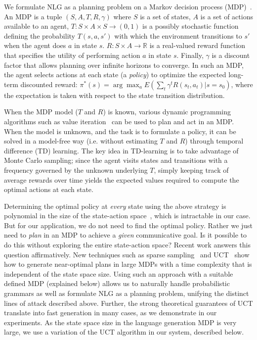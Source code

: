We formulate NLG as a planning problem on a Markov decision process
(MDP)~\cite{puterman_1994_markov}. An MDP is a tuple $(S, A, T, R, \gamma)$ where $S$ is a
set of states, $A$ is a set of actions available to an agent,
$T:S\times A\times S \rightarrow (0,1)$ is a possibly stochastic
function defining the probability $T(s,a,s')$ with which the
environment transitions to $s'$ when the agent does $a$ in state $s$.
$R:S\times A \rightarrow \mathbb{R}$ is a real-valued reward function that
specifies the utility of performing action $a$ in state $s$. Finally,
$\gamma$ is a discount factor that allows planning over infinite
horizons to converge. In such an MDP, the agent selects actions at
each state (a {\em policy}) to optimize the expected long-term
discounted reward: $\pi^*(s)=\arg \max_a E(\sum_t \gamma^t
R(s_t,a_t)|s=s_0)$, where the expectation is taken with respect to the
state transition distribution.

When the MDP model ($T$ and $R$) is
known, various dynamic programming algorithms such as value
iteration~\cite{bellman_1957_dynamic} can be used to plan and act in an MDP. When the
model is unknown, and the task is to formulate a policy, it can be
solved in a model-free way (i.e. without estimating $T$ and $R$)
through temporal difference (TD) learning. The key idea in TD-learning
is to take advantage of Monte Carlo sampling; since the agent visits
states and transitions with a frequency governed by the unknown
underlying $T$, simply keeping track of average rewards over time
yields the expected values required to compute the optimal actions at
each state.

Determining the optimal policy at {\em every} state using the above
strategy is polynomial in the size of the state-action
space~\cite{brafman_2003_rmax}, which is intractable in our case. But for our application, we do not
need to find the optimal policy. Rather we just need to {\em plan} in
an MDP to achieve a {\em given} communicative goal. Is it
possible to do this without exploring the entire state-action space?
Recent work answers this question affirmatively. New techniques such
as sparse sampling~\cite{kearns_1999_sparse} and
UCT~\cite{kocsis_bandit_2006} show how to generate near-optimal plans
in large MDPs with a time complexity that is independent of the state
space size. Using such an approach with a suitable defined MDP
(explained below) allows us to naturally handle
probabilistic grammars as well as formulate NLG as a planning problem,
unifying the distinct lines of attack described above. Further, the
strong theoretical guarantees of UCT translate into fast generation in
many cases, as we demonstrate in our experiments.
As the state space size in the language generation MDP is
very large, we use a variation of the UCT algorithm in our system,
described below. 



